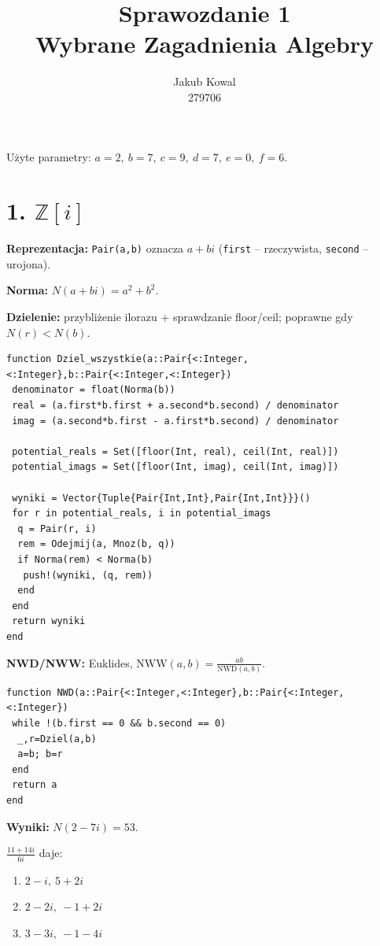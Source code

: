 \documentclass[11pt,a4paper]{article} %
\title{\textbf{Sprawozdanie 1}\\Wybrane Zagadnienia Algebry}
\author{Jakub Kowal\\279706}
\date{}
\begin{document}
\maketitle

Użyte parametry: $a=2,\ b=7,\ c=9,\ d=7,\ e=0,\ f=6$.

\section*{1. $\mathbb{Z}[i]$}

\textbf{Reprezentacja:} \texttt{Pair(a,b)} oznacza $a+bi$ (\texttt{first} – rzeczywista, \texttt{second} – urojona).

\textbf{Norma:} $N(a+bi)=a^2+b^2$.

\textbf{Dzielenie:} przybliżenie ilorazu + sprawdzanie floor/ceil; poprawne gdy $N(r)<N(b)$.

{\footnotesize
\begin{lstlisting}
function Dziel_wszystkie(a::Pair{<:Integer,<:Integer},b::Pair{<:Integer,<:Integer})
 denominator = float(Norma(b))
 real = (a.first*b.first + a.second*b.second) / denominator
 imag = (a.second*b.first - a.first*b.second) / denominator

 potential_reals = Set([floor(Int, real), ceil(Int, real)])
 potential_imags = Set([floor(Int, imag), ceil(Int, imag)])

 wyniki = Vector{Tuple{Pair{Int,Int},Pair{Int,Int}}}()
 for r in potential_reals, i in potential_imags
  q = Pair(r, i)
  rem = Odejmij(a, Mnoz(b, q))
  if Norma(rem) < Norma(b)
   push!(wyniki, (q, rem))
  end
 end
 return wyniki
end
\end{lstlisting}
}

\textbf{NWD/NWW:} Euklides, $\mathrm{NWW}(a,b)=\frac{ab}{\mathrm{NWD}(a,b)}$.

{\footnotesize
\begin{lstlisting}
function NWD(a::Pair{<:Integer,<:Integer},b::Pair{<:Integer,<:Integer})
 while !(b.first == 0 && b.second == 0)
  _,r=Dziel(a,b)
  a=b; b=r
 end
 return a
end
\end{lstlisting}
}

\textbf{Wyniki:}
$N(2-7i)=53$.

$\frac{11+14i}{6i}$ daje:
\begin{enumerate}
\item $2-i,\ 5+2i$
\item $2-2i,\ -1+2i$
\item $3-3i,\ -1-4i$
\end{enumerate}
\end{document}
